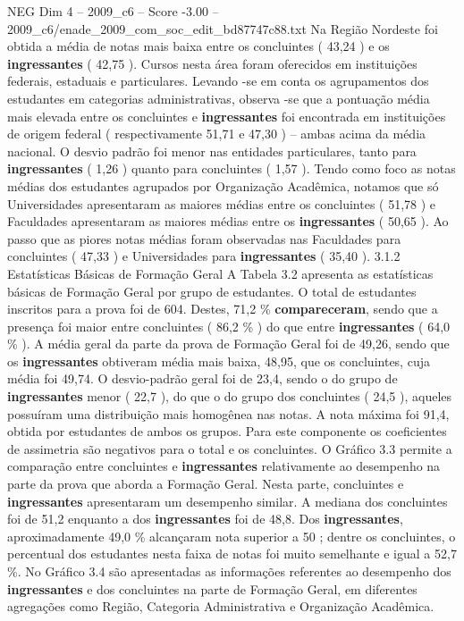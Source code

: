 \begin{textsample}{NEG Dim 4 – 2009\_c6 – Score -3.00 – 2009\_c6/enade\_2009\_com\_soc\_edit\_bd87747c88.txt}
Na Região Nordeste foi obtida a média de notas mais baixa entre os concluintes ( 43,24 ) e os \textbf{ingressantes} ( 42,75 ).
Cursos nesta área foram oferecidos em instituições federais, estaduais e particulares.
Levando -se em conta os agrupamentos dos estudantes em categorias administrativas, observa -se que a pontuação média mais elevada entre os concluintes e \textbf{ingressantes} foi encontrada em instituições de origem federal ( respectivamente 51,71 e 47,30 ) – ambas acima da média nacional.
O desvio padrão foi menor nas entidades particulares, tanto para \textbf{ingressantes} ( 1,26 ) quanto para concluintes ( 1,57 ).
Tendo como foco as notas médias dos estudantes agrupados por Organização Acadêmica, notamos que só Universidades apresentaram as maiores médias entre os concluintes ( 51,78 ) e Faculdades apresentaram as maiores médias entre os \textbf{ingressantes} ( 50,65 ).
Ao passo que as piores notas médias foram observadas nas Faculdades para concluintes ( 47,33 ) e Universidades para \textbf{ingressantes} ( 35,40 ). 3.1.2 Estatísticas Básicas de Formação Geral A Tabela 3.2 apresenta as estatísticas básicas de Formação Geral por grupo de estudantes.
O total de estudantes inscritos para a prova foi de 604.
Destes, 71,2 \% \textbf{compareceram}, sendo que a presença foi maior entre concluintes ( 86,2 \% ) do que entre \textbf{ingressantes} ( 64,0 \% ).
A média geral da parte da prova de Formação Geral foi de 49,26, sendo que os \textbf{ingressantes} obtiveram média mais baixa, 48,95, que os concluintes, cuja média foi 49,74.
O desvio-padrão geral foi de 23,4, sendo o do grupo de \textbf{ingressantes} menor ( 22,7 ), do que o do grupo dos concluintes ( 24,5 ), aqueles possuíram uma distribuição mais homogênea nas notas.
A nota máxima foi 91,4, obtida por estudantes de ambos os grupos.
Para este componente os coeficientes de assimetria são negativos para o total e os concluintes.
O Gráfico 3.3 permite a comparação entre concluintes e \textbf{ingressantes} relativamente ao desempenho na parte da prova que aborda a Formação Geral.
Nesta parte, concluintes e \textbf{ingressantes} apresentaram um desempenho similar.
A mediana dos concluintes foi de 51,2 enquanto a dos \textbf{ingressantes} foi de 48,8.
Dos \textbf{ingressantes}, aproximadamente 49,0 \% alcançaram nota superior a 50 ; dentre os concluintes, o percentual dos estudantes nesta faixa de notas foi muito semelhante e igual a 52,7 \%.
No Gráfico 3.4 são apresentadas as informações referentes ao desempenho dos \textbf{ingressantes} e dos concluintes na parte de Formação Geral, em diferentes agregações como Região, Categoria Administrativa e Organização Acadêmica.

\end{textsample}
